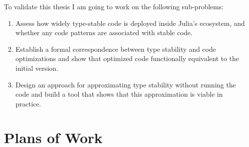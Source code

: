 \documentclass[oneside,openright,titlepage,numbers=noenddot,%
headinclude,footinclude,cleardoublepage=empty,abstract=on,
BCOR=5mm,paper=a4,fontsize=11pt,
dvipsnames
]{scrreprt}
\begin{document}
To validate this thesis I am going to work on the following sub-problems:
\begin{enumerate}

  \item
  Assess how widely type-stable code is deployed inside Julia's ecosystem, and
  whether any code patterns are associated with stable code.

  \item
  Establish a formal correspondence between type stability and code optimizations and
  show that optimized code functionally equivalent to the initial version.

  \item
  Design an approach for approximating type stability without running the code and
  build a tool that shows that this approximation is viable in practice.
\end{enumerate}





\chapter{Plans of Work}%
\label{chap-proposed}
\end{document}
